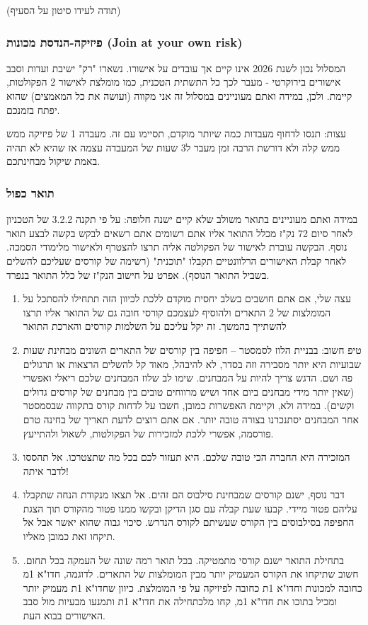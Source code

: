 \documentclass[a4paper,12pt]{article}
\begin{document}
(תודה לעידו סיטון על הסעיף)

\subsubsection{פיזיקה-הנדסת מכונות \textenglish{(Join at your own risk)}}

המסלול נכון לשנת 2026 אינו קיים אך עובדים על אישורו. נשארו "רק" ישיבת ועדות וסבב אישורים בירוקרטי - מעבר לכך כל התשתית הטכנית, כמו מומלצת לאישור 2 הפקולטות, קיימת. ולכן, במידה ואתם מעוניינים במסלול זה אני מקווה (ועושה את כל המאמצים) שהוא יפתח בזמנכם.

עצות: תנסו לדחוף מעבדות כמה שיותר מוקדם, תסיימו עם זה. מעבדה 1 של פיזיקה ממש ממש קלה ולא דורשת הרבה זמן מעבר ל3 שעות של המעבדה עצמה אז שהיא לא תהיה באמת שיקול מבחינתכם.

\subsubsection{תואר כפול}

במידה ואתם מעוניינים בתואר משולב שלא קיים ישנה חלופה: על פי תקנה 3.2.2 של הטכניון לאחר סיום 72 נק"ז מכלל התואר אליו אתם רשומים אתם רשאים לבקש בקשה לבצע תואר נוסף. הבקשה עוברת לאישור של הפקולטה אליה תרצו להצטרף ולאישור מלימודי הסמכה. לאחר קבלת האישורים הרלוונטיים תקבלו "תוכנית" (רשימה של קורסים שעליכם להשלים בשביל התואר הנוסף).
אפרט על חישוב הנק"ז של כלל התואר בנפרד.

\begin{enumerate}
    \item עצה שלי, אם אתם חושבים בשלב יחסית מוקדם ללכת לכיוון הזה תתחילו להסתכל על המומלצות של 2 התארים ולהוסיף לעצמכם קורסי חובה גם של התואר אליו תרצו להשתייך בהמשך. זה יקל עליכם על השלמות קורסים והארכת התואר
    \item טיפ חשוב: בבניית הלוז לסמסטר – חפיפה בין קורסים של התארים השונים מבחינת שעות שבועיות היא יותר מסבירה וזה בסדר, לא להיבהל, מאוד קל להשלים הרצאות או תרגולים פה ושם. הדגש צריך להיות על המבחנים. שימו לב שלוז המבחנים שלכם ריאלי ואפשרי (שאין יותר מידי מבחנים ביום אחד ושיש מרווחים טובים בין מבחנים של קורסים גדולים וקשים). במידה ולא, וקיימת האפשרות כמובן, חשבו על לדחות קורס בתקווה שבסמסטר אחר המבחנים יסתנכרנו בצורה טובה יותר. אם אתם רוצים לדעת תאריך של בחינה טרם פורסמה, אפשרי ללכת למזכירות של הפקולטות, לשאול ולהתייעץ.
    \item המזכירה היא החברה הכי טובה שלכם. היא תעזור לכם בכל מה שתצטרכו. אל תהססו לדבר איתה!
    \item דבר נוסף, ישנם קורסים שמבחינת סילבוס הם זהים. אל תצאו מנקודת הנחה שתקבלו עליהם פטור מיידי. קבעו שעת קבלה עם סגן הדיקן ובקשו ממנו פטור מהקורס תוך הצגת החפיפה בסילבוסים בין הקורס שעשיתם לקורס הנדרש. סיכוי גבוה שהוא יאשר אבל אל תיקחו זאת כמובן מאליו.
    \item בתחילת התואר ישנם קורסי מתמטיקה. בכל תואר רמה שונה של העמקה בכל תחום. חשוב שתיקחו את הקורס המעמיק יותר מבין המומלצות של התארים. לדוגמה, חדו"א 1מ כחובה למכונות וחדו"א 1ת כחובה לפיזיקה על פי המומלצת. כיוון שחדו"א 1ת מעמיק יותר ומכיל בתוכו את חדו"א 1מ, קחו מלכתחילה את חדו"א 1ת ותמנעו מבעיות מול סבב האישורים בבוא העת.
\end{enumerate}
\end{document}
